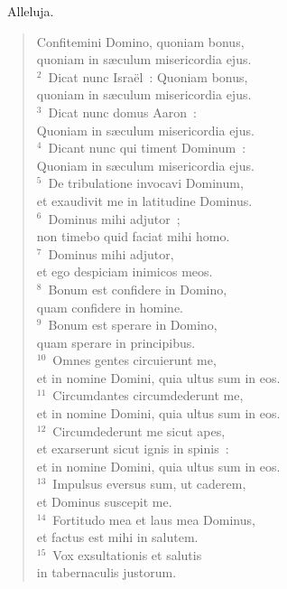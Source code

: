 ~\lettrine[lines=10,image=true,loversize=0.05,lraise=-0.03]{A}{}lleluja. \begin{flushleft}\begin{verse}\vspace{6pt}Confitemini Domino, quoniam bonus,\\ quoniam in s\ae culum misericordia ejus.\\
${}^{2}$~Dicat nunc Isra\"el~: Quoniam bonus,\\ quoniam in s\ae culum misericordia ejus.\\
${}^{3}$~Dicat nunc domus Aaron~:\\ Quoniam in s\ae culum misericordia ejus.\\
${}^{4}$~Dicant nunc qui timent Dominum~:\\ Quoniam in s\ae culum misericordia ejus.\\
${}^{5}$~De tribulatione invocavi Dominum,\\ et exaudivit me in latitudine Dominus.\\
${}^{6}$~Dominus mihi adjutor~;\\ non timebo quid faciat mihi homo.\\
${}^{7}$~Dominus mihi adjutor,\\ et ego despiciam inimicos meos.\\
${}^{8}$~Bonum est confidere in Domino,\\ quam confidere in homine.\\
${}^{9}$~Bonum est sperare in Domino,\\ quam sperare in principibus.\\
${}^{10}$~Omnes gentes circuierunt me,\\ et in nomine Domini, quia ultus sum in eos.\\
${}^{11}$~Circumdantes circumdederunt me,\\ et in nomine Domini, quia ultus sum in eos.\\
${}^{12}$~Circumdederunt me sicut apes,\\ et exarserunt sicut ignis in spinis~:\\ et in nomine Domini, quia ultus sum in eos.\\
${}^{13}$~Impulsus eversus sum, ut caderem,\\ et Dominus suscepit me.\\
${}^{14}$~Fortitudo mea et laus mea Dominus,\\ et factus est mihi in salutem.\\
${}^{15}$~Vox exsultationis et salutis\\ in tabernaculis justorum.\\

\end{verse}
\end{flushleft}
